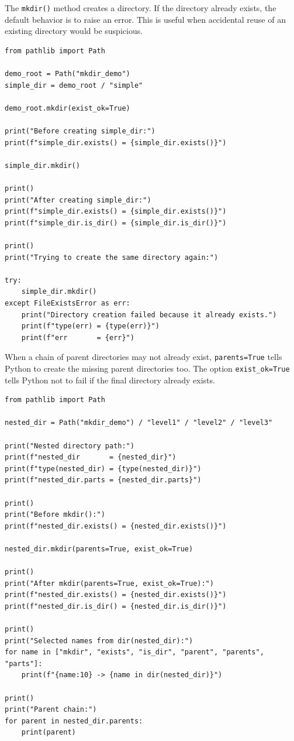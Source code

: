 The \texttt{mkdir()} method creates a directory. If the directory already exists, the default behavior is to raise an error. This is useful when accidental reuse of an existing directory would be suspicious.

\begin{verbatim}
from pathlib import Path

demo_root = Path("mkdir_demo")
simple_dir = demo_root / "simple"

demo_root.mkdir(exist_ok=True)

print("Before creating simple_dir:")
print(f"simple_dir.exists() = {simple_dir.exists()}")

simple_dir.mkdir()

print()
print("After creating simple_dir:")
print(f"simple_dir.exists() = {simple_dir.exists()}")
print(f"simple_dir.is_dir() = {simple_dir.is_dir()}")

print()
print("Trying to create the same directory again:")

try:
    simple_dir.mkdir()
except FileExistsError as err:
    print("Directory creation failed because it already exists.")
    print(f"type(err) = {type(err)}")
    print(f"err       = {err}")
\end{verbatim}

When a chain of parent directories may not already exist, \texttt{parents=True} tells Python to create the missing parent directories too. The option \texttt{exist\_ok=True} tells Python not to fail if the final directory already exists.

\begin{verbatim}
from pathlib import Path

nested_dir = Path("mkdir_demo") / "level1" / "level2" / "level3"

print("Nested directory path:")
print(f"nested_dir       = {nested_dir}")
print(f"type(nested_dir) = {type(nested_dir)}")
print(f"nested_dir.parts = {nested_dir.parts}")

print()
print("Before mkdir():")
print(f"nested_dir.exists() = {nested_dir.exists()}")

nested_dir.mkdir(parents=True, exist_ok=True)

print()
print("After mkdir(parents=True, exist_ok=True):")
print(f"nested_dir.exists() = {nested_dir.exists()}")
print(f"nested_dir.is_dir() = {nested_dir.is_dir()}")

print()
print("Selected names from dir(nested_dir):")
for name in ["mkdir", "exists", "is_dir", "parent", "parents", "parts"]:
    print(f"{name:10} -> {name in dir(nested_dir)}")

print()
print("Parent chain:")
for parent in nested_dir.parents:
    print(parent)
\end{verbatim}

